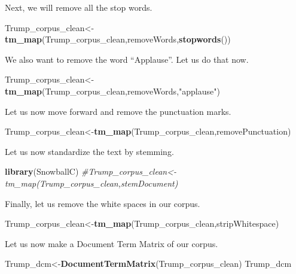 \documentclass[]{article}
\newenvironment{Shaded}{\begin{snugshade}}{\end{snugshade}}
\newcommand{\KeywordTok}[1]{\textcolor[rgb]{0.13,0.29,0.53}{\textbf{#1}}}
\newcommand{\StringTok}[1]{\textcolor[rgb]{0.31,0.60,0.02}{#1}}
\newcommand{\CommentTok}[1]{\textcolor[rgb]{0.56,0.35,0.01}{\textit{#1}}}
\newcommand{\NormalTok}[1]{#1}
\begin{document}
Next, we will remove all the stop words.

\begin{Shaded}
\begin{Highlighting}[]
\NormalTok{Trump_corpus_clean<-}\KeywordTok{tm_map}\NormalTok{(Trump_corpus_clean,removeWords,}\KeywordTok{stopwords}\NormalTok{())}
\end{Highlighting}
\end{Shaded}

We also want to remove the word ``Applause''. Let us do that now.

\begin{Shaded}
\begin{Highlighting}[]
\NormalTok{Trump_corpus_clean<-}\KeywordTok{tm_map}\NormalTok{(Trump_corpus_clean,removeWords,}\StringTok{"applause"}\NormalTok{)}
\end{Highlighting}
\end{Shaded}

Let us now move forward and remove the punctuation marks.

\begin{Shaded}
\begin{Highlighting}[]
\NormalTok{Trump_corpus_clean<-}\KeywordTok{tm_map}\NormalTok{(Trump_corpus_clean,removePunctuation)}
\end{Highlighting}
\end{Shaded}

Let us now standardize the text by stemming.

\begin{Shaded}
\begin{Highlighting}[]
\KeywordTok{library}\NormalTok{(SnowballC)}
\CommentTok{#Trump_corpus_clean<-tm_map(Trump_corpus_clean,stemDocument)}
\end{Highlighting}
\end{Shaded}

Finally, let us remove the white spaces in our corpus.

\begin{Shaded}
\begin{Highlighting}[]
\NormalTok{Trump_corpus_clean<-}\KeywordTok{tm_map}\NormalTok{(Trump_corpus_clean,stripWhitespace)}
\end{Highlighting}
\end{Shaded}

Let us now make a Document Term Matrix of our corpus.

\begin{Shaded}
\begin{Highlighting}[]
\NormalTok{Trump_dcm<-}\KeywordTok{DocumentTermMatrix}\NormalTok{(Trump_corpus_clean)}
\NormalTok{Trump_dcm}
\end{Highlighting}
\end{Shaded}
\end{document}
